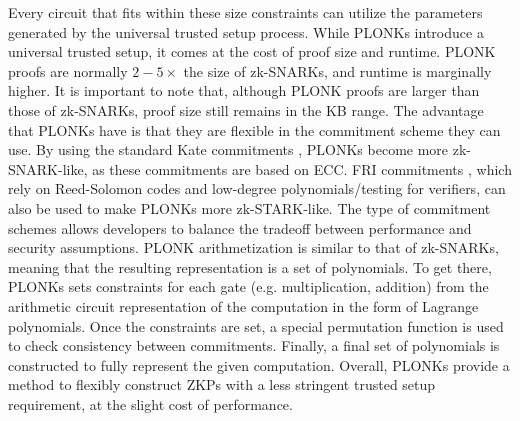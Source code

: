 Every circuit \Cir that fits within these size constraints can utilize the parameters generated by the universal trusted setup process. While PLONKs introduce a universal trusted setup, it comes at the cost of proof size and \Vrf runtime. PLONK proofs are normally $2-5\times$ the size of zk-SNARKs, and \Vrf runtime is marginally higher. It is important to note that, although PLONK proofs are larger than those of zk-SNARKs, proof size still remains in the KB range. The advantage that PLONKs have is that they are flexible in the commitment scheme they can use. By using the standard Kate commitments \cite{kate2010constant}, PLONKs become more zk-SNARK-like, as these commitments are based on ECC. FRI commitments \cite{ben2018fast}, which rely on Reed-Solomon codes and low-degree polynomials/testing for verifiers, can also be used to make PLONKs more zk-STARK-like. The type of commitment schemes allows developers to balance the tradeoff between performance and security assumptions. PLONK arithmetization is similar to that of zk-SNARKs, meaning that the resulting representation is a set of polynomials. To get there, PLONKs sets constraints for each gate (e.g. multiplication, addition) from the arithmetic circuit representation of the computation in the form of  Lagrange polynomials. Once the constraints are set, a special permutation function is used to check consistency between commitments. Finally, a final set of polynomials is constructed to fully represent the given computation. Overall, PLONKs provide a method to flexibly construct ZKPs with a less stringent trusted setup requirement, at the slight cost of performance. 

